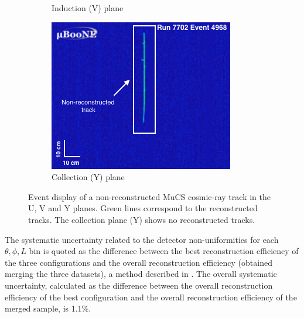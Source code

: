 \documentclass[a4paper,11pt]{article}
\begin{document}
\begin{figure}[htbp]
\begin{center}
\begin{subfigure}{0.3\textwidth}
      \caption{Induction (V) plane} \label{fig:v}
    \end{subfigure}
    \begin{subfigure}{0.3\textwidth}
      \includegraphics[width=\linewidth]{figures/y.png}
      \caption{Collection (Y) plane} \label{fig:y}
    \end{subfigure}    \caption{Event display of a non-reconstructed MuCS cosmic-ray track in the U, V and Y planes. Green lines correspond to the reconstructed tracks. The collection plane (Y) shows no reconstructed tracks.} \label{fig:example}
  \end{center}
\end{figure}

The systematic uncertainty related to the detector non-uniformities for each $\theta,\phi,L$ bin is quoted as the difference between the best reconstruction efficiency of the three configurations and the overall reconstruction efficiency (obtained merging the three datasets), a method described in \cite{besiii}. The overall systematic uncertainty, calculated as the difference between the overall reconstruction efficiency of the best configuration and the overall reconstruction efficiency of the merged sample, is 1.1\%.


\end{document}
